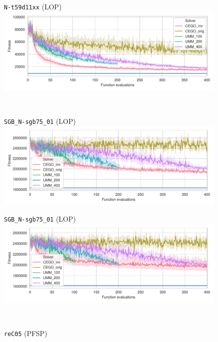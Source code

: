 \documentclass[sigconf,dvipsnames]{acmart}
\begin{document}
{\begin{figure}
\begin{minipage}{0.49\linewidth}
\end{minipage}
\begin{minipage}{0.49\linewidth}
  \texttt{N-t59d11xx} (LOP)\\[-0.5ex]
  \includegraphics[width=\textwidth]{../img/fitness_lop_IO_N-t59d11xx}
\end{minipage}
\\
\begin{minipage}{0.49\linewidth}
  \texttt{SGB\_N-sgb75\_01} (LOP)\\[-0.5ex]
  \includegraphics[width=\textwidth]{../img/fitness_lop_SGB_N-sgb75_01}
\end{minipage}
\begin{minipage}{0.49\linewidth}
  \texttt{SGB\_N-sgb75\_01} (LOP)\\[-0.5ex]
  \includegraphics[width=\textwidth]{../img/fitness_lop_SGB_N-sgb75_02}
\end{minipage}
\\
\begin{minipage}{0.49\linewidth}
  \texttt{reC05} (PFSP)\\[-0.5ex]

\end{minipage}
\end{figure}}
\end{document}
